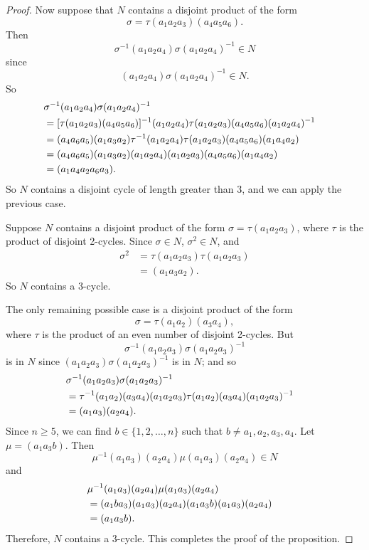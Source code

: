 {\begin{proof}
 
Now suppose that $N$ contains a disjoint product of the form
\[
\sigma = \tau(a_1 a_2 a_3)(a_4 a_5 a_6).
\]
Then
\[
\sigma^{-1}(a_1 a_2 a_4)\sigma(a_1 a_2 a_4)^{-1} \in N
\]
since
\[
(a_1 a_2 a_4)\sigma(a_1 a_2 a_4)^{-1} \in N.
\]
So
\begin{align*}
\lefteqn{\sigma^{-1}(a_1 a_2 a_4)\sigma(a_1 a_2 a_4)^{-1} } \\
& = [ \tau (a_1 a_2 a_3) (a_4 a_5 a_6) ]^{-1}  (a_1 a_2 a_4) 
      \tau (a_1 a_2 a_3) (a_4 a_5 a_6) (a_1 a_2 a_4)^{-1} \\
& = (a_4 a_6 a_5) (a_1 a_3 a_2) \tau^{-1}(a_1 a_2 a_4)  
      \tau (a_1 a_2 a_3) (a_4 a_5 a_6) (a_1 a_4 a_2) \\
& = (a_4 a_6 a_5)(a_1 a_3 a_2) (a_1 a_2 a_4)
      (a_1 a_2 a_3) (a_4 a_5 a_6)(a_1 a_4 a_2) \\
& = (a_1 a_4 a_2 a_6 a_3).
\end{align*}
So $N$ contains a disjoint cycle of length greater than 3, and we can
apply the previous case. 
 
 
Suppose $N$ contains a disjoint product of the form $\sigma = \tau(a_1
a_2 a_3)$, where $\tau$ is the product of disjoint 2-cycles. Since
$\sigma \in N$, $\sigma^2 \in N$, and
\begin{align*}
\sigma^2
& = \tau(a_1 a_2 a_3)\tau(a_1 a_2 a_3) \\
& =(a_1 a_3 a_2).
\end{align*}
So $N$ contains a 3-cycle.
 
 
The only remaining possible case is a disjoint product of the form
\[
\sigma = \tau (a_1 a_2) (a_3 a_4),
\]
where $\tau$ is the product of an even number of disjoint 2-cycles.
But 
\[
\sigma^{-1}(a_1 a_2 a_3)\sigma(a_1 a_2 a_3)^{-1}
\]
is in $N$ since $(a_1 a_2 a_3)\sigma(a_1 a_2 a_3)^{-1}$ is in $N$; and
so 
\begin{align*}
\lefteqn{\sigma^{-1}(a_1 a_2 a_3)\sigma(a_1 a_2 a_3)^{-1} } \\
& = \tau^{-1} (a_1 a_2) (a_3 a_4) (a_1 a_2 a_3) 
      \tau (a_1 a_2)(a_3 a_4)(a_1 a_2 a_3)^{-1} \\
& = (a_1 a_3)(a_2 a_4).
\end{align*}
Since $n \geq 5$, we can find $b \in \{1, 2, \ldots, n \}$ such that
$b \neq a_1, a_2, a_3, a_4$. Let $\mu = (a_1 a_3 b)$. Then
\[
\mu^{-1} (a_1 a_3)(a_2 a_4) \mu (a_1 a_3)(a_2 a_4) \in N
\]
and
\begin{align*}
\lefteqn{\mu^{-1} (a_1 a_3)(a_2 a_4) \mu (a_1 a_3)(a_2 a_4) } \\
& = (a_1 b a_3)(a_1 a_3)(a_2 a_4) 
      (a_1 a_3 b)(a_1 a_3)(a_2 a_4) \\
& = (a_1 a_3 b ).
\end{align*}
Therefore, $N$ contains a 3-cycle. This completes the proof of the
proposition.  
\end{proof}
 
}
